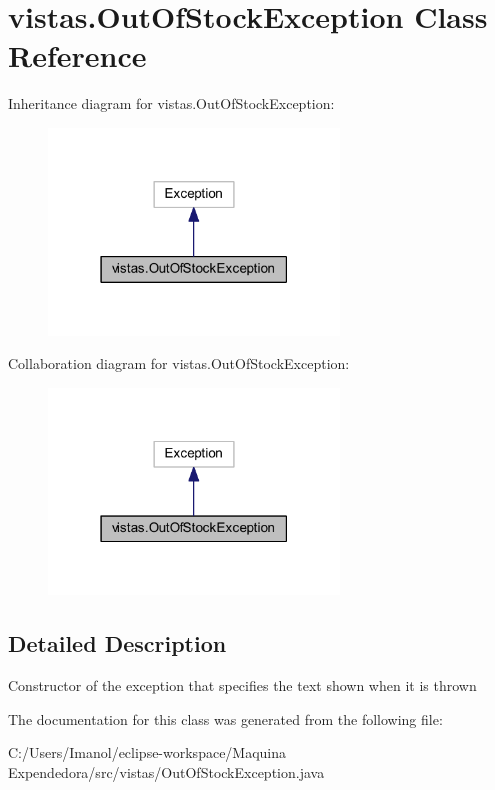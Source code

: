 \hypertarget{classvistas_1_1_out_of_stock_exception}{}\section{vistas.\+Out\+Of\+Stock\+Exception Class Reference}
\label{classvistas_1_1_out_of_stock_exception}


Inheritance diagram for vistas.\+Out\+Of\+Stock\+Exception\+:
\nopagebreak
\begin{figure}[H]
\begin{center}
\leavevmode
\includegraphics[width=219pt]{classvistas_1_1_out_of_stock_exception__inherit__graph}
\end{center}
\end{figure}


Collaboration diagram for vistas.\+Out\+Of\+Stock\+Exception\+:
\nopagebreak
\begin{figure}[H]
\begin{center}
\leavevmode
\includegraphics[width=219pt]{classvistas_1_1_out_of_stock_exception__coll__graph}
\end{center}
\end{figure}


\subsection{Detailed Description}
Constructor of the exception that specifies the text shown when it is thrown 

The documentation for this class was generated from the following file\+:\begin{DoxyCompactItemize}
\item 
C\+:/\+Users/\+Imanol/eclipse-\/workspace/\+Maquina Expendedora/src/vistas/Out\+Of\+Stock\+Exception.\+java\end{DoxyCompactItemize}
